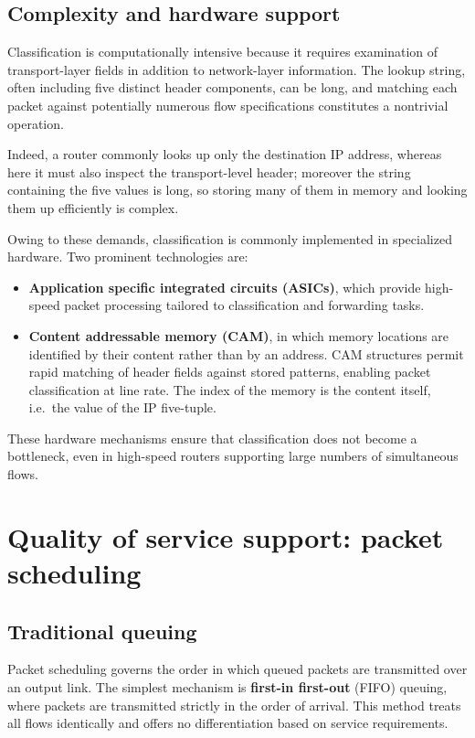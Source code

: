 \documentclass[11pt,a4paper,openany]{report}
\begin{document}
\subsection{Complexity and hardware support}

Classification is computationally intensive because it requires examination of transport-layer fields in addition to network-layer information. The lookup string, often including five distinct header components, can be long, and matching each packet against potentially numerous flow specifications constitutes a nontrivial operation.

Indeed, a router commonly looks up only the destination IP address, whereas here it must also inspect the transport-level header; moreover the string containing the five values is long, so storing many of them in memory and looking them up efficiently is complex.

Owing to these demands, classification is commonly implemented in specialized hardware. Two prominent technologies are:

\begin{itemize}
\item \textbf{Application specific integrated circuits (ASICs)}, which provide high-speed packet processing tailored to classification and forwarding tasks.
\item \textbf{Content addressable memory (CAM)}, in which memory locations are identified by their content rather than by an address. CAM structures permit rapid matching of header fields against stored patterns, enabling packet classification at line rate. The index of the memory is the content itself, i.e.\ the value of the IP five-tuple.
\end{itemize}

These hardware mechanisms ensure that classification does not become a bottleneck, even in high-speed routers supporting large numbers of simultaneous flows.

\section{Quality of service support: packet scheduling}

\subsection{Traditional queuing}

Packet scheduling governs the order in which queued packets are transmitted over an output link. The simplest mechanism is \textbf{first-in first-out} (FIFO) queuing, where packets are transmitted strictly in the order of arrival. This method treats all flows identically and offers no differentiation based on service requirements.
\end{document}
